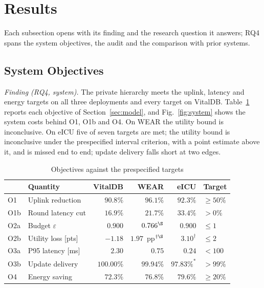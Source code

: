 \section{Results}
\label{sec:results}
Each subsection opens with its finding and the research question it answers;
RQ4 spans the system objectives, the audit and the comparison with prior
systems.

\subsection{System Objectives}
\label{sec:results:objectives}
\emph{Finding (RQ4, system).} The private hierarchy meets the uplink,
latency and energy targets on all three deployments and every target on
VitalDB. Table~\ref{tab:objectives} reports each objective of
Section~\ref{sec:model}, and Fig.~\ref{fig:system} shows the system costs
behind O1, O1b and O4. On WEAR the utility bound is inconclusive. On eICU
five of seven targets are met; the utility bound is inconclusive under the
prespecified interval criterion, with a point estimate above it, and is
missed end to end; update delivery falls short at two edges.

\begin{table}[!t]
\centering
\caption{Objectives against the prespecified targets}
\label{tab:objectives}
\small
\setlength{\tabcolsep}{3pt}
\begin{tabular}{llrrrl}
\toprule
& Quantity & VitalDB & WEAR & eICU & Target \\
\midrule
O1  & Uplink reduction     & $90.8\%$   & $96.1\%$   & $92.3\%$   & $\ge 50\%$ \\
O1b & Round latency cut    & $16.9\%$   & $21.7\%$   & $33.4\%$   & $> 0\%$ \\
O2a & Budget $\varepsilon$        & $0.900$    & $0.766^{\S}$ & $0.900$  & $\le 1$ \\
O2b & Utility loss [pts]   & $-1.18$    & $1.97$~pp$^{\dagger\S}$ & $3.10^{\dagger}$ & $\le 2$ \\
O3a & P95 latency [ms]     & $2.30$     & $0.75$     & $0.24$     & $< 100$ \\
O3b & Update delivery      & $100.00\%$ & $99.94\%$  & $97.83\%^{\ast}$ & $> 99\%$ \\
O4  & Energy saving        & $72.3\%$   & $76.8\%$   & $79.6\%$   & $\ge 20\%$ \\
\bottomrule
\end{tabular}
\end{table}

